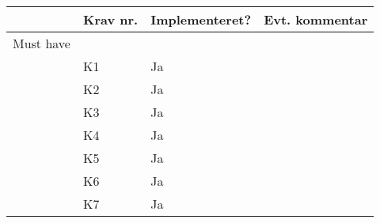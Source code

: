 \documentclass[class=article, crop=false]{standalone}
\begin{document}
    \begin{table}[]
        \begin{tabular}{|l|l|l|l|}
            \hline
            & Krav nr. & Implementeret?     & Evt. kommentar                                                                                                                                                                                     \\ \hline
            Must have       &          &                    &                                                                                                                                                                                                    \\ \hline
            & K1       & Ja                 &                                                                                                                                                                                                    \\ \hline
            & K2       & Ja                 &                                                                                                                                                                                                    \\ \hline
            & K3       & Ja                 &                                                                                                                                                                                                    \\ \hline
            & K4       & Ja                 &                                                                                                                                                                                                    \\ \hline
            & K5       & Ja                 &                                                                                                                                                                                                    \\ \hline
            & K6       & Ja                 &                                                                                                                                                                                                    \\ \hline
            & K7       & Ja                 &                                                                                                                                                                                                    \\ \hline

\end{tabular}
\end{table}
\end{document}
